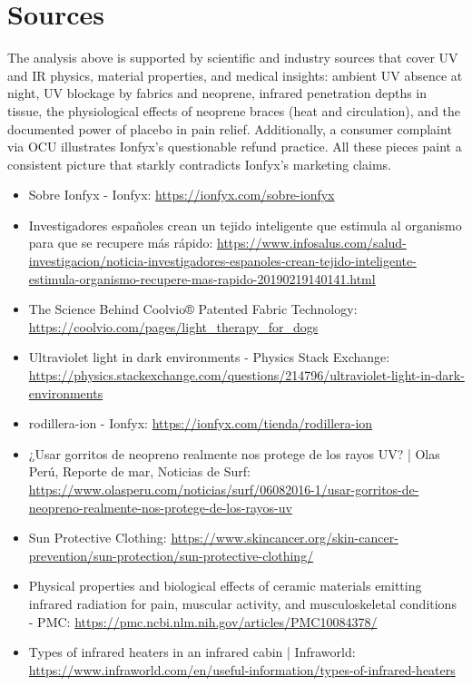 \documentclass{article}
\begin{document}
\section*{Sources}
The analysis above is supported by scientific and industry sources that cover UV and IR physics, material properties, and medical insights: ambient UV absence at night, UV blockage by fabrics and neoprene, infrared penetration depths in tissue, the physiological effects of neoprene braces (heat and circulation), and the documented power of placebo in pain relief. Additionally, a consumer complaint via OCU illustrates Ionfyx's questionable refund practice. All these pieces paint a consistent picture that starkly contradicts Ionfyx's marketing claims.

\begin{itemize}
    \item Sobre Ionfyx - Ionfyx: {\small\url{https://ionfyx.com/sobre-ionfyx}}
    \item Investigadores españoles crean un tejido inteligente que estimula al organismo para que se recupere más rápido: {\small\url{https://www.infosalus.com/salud-investigacion/noticia-investigadores-espanoles-crean-tejido-inteligente-estimula-organismo-recupere-mas-rapido-20190219140141.html}}
    \item The Science Behind Coolvio® Patented Fabric Technology: {\small\url{https://coolvio.com/pages/light_therapy_for_dogs}}
    \item Ultraviolet light in dark environments - Physics Stack Exchange: {\small\url{https://physics.stackexchange.com/questions/214796/ultraviolet-light-in-dark-environments}}
    \item rodillera-ion - Ionfyx: {\small\url{https://ionfyx.com/tienda/rodillera-ion}}
    \item ¿Usar gorritos de neopreno realmente nos protege de los rayos UV? | Olas Perú, Reporte de mar, Noticias de Surf: {\small\url{https://www.olasperu.com/noticias/surf/06082016-1/usar-gorritos-de-neopreno-realmente-nos-protege-de-los-rayos-uv}}
    \item Sun Protective Clothing: {\small\url{https://www.skincancer.org/skin-cancer-prevention/sun-protection/sun-protective-clothing/}}
    \item Physical properties and biological effects of ceramic materials emitting infrared radiation for pain, muscular activity, and musculoskeletal conditions - PMC: {\small\url{https://pmc.ncbi.nlm.nih.gov/articles/PMC10084378/}}
    \item Types of infrared heaters in an infrared cabin | Infraworld: {\small\url{https://www.infraworld.com/en/useful-information/types-of-infrared-heaters}}

\end{itemize}
\end{document}
